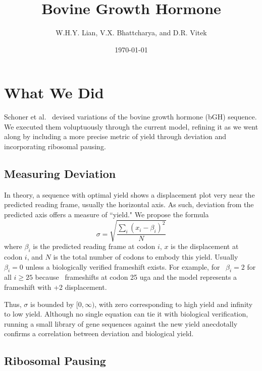 \documentclass[10pt,twocolumn]{article}
\begin{document}
\title{{\bf Bovine Growth Hormone}}
\author{{\sc W.H.Y. Lian, V.X. Bhattcharya, and D.R. Vitek}}
\date{{\sc \today}}
\maketitle

\section{What We Did}
\label{whatwedid}

Schoner et al.~\cite{schoner:bgh} devised variations of the bovine growth hormone (bGH) sequence.
We executed them voluptuously through the current model, refining it as we went along by including
a more precise metric of yield through deviation and incorporating ribosomal pausing.

\subsection{Measuring Deviation}
\label{whatwedid:lbd}

In theory, a sequence with optimal yield shows a displacement plot very near the predicted reading frame,
usually the horizontal axis. As such, deviation from the predicted axis offers a measure of ``yield."
We propose the formula
\begin{equation}
    \label{eqn:lbd}
    \sigma = \sqrt{\frac{\sum_i \left(x_i - \beta_i\right)^2}{N}}
\end{equation}
where $\beta_i$ is the predicted reading frame at codon $i$, $x$ is the displacement at codon $i$,
and $N$ is the total number of codons to embody this yield. Usually $\beta_i = 0$ unless a biologically verified frameshift exists. For example, for \prfB\ $\beta_i = 2$ for all $i \geq 25$ because \prfB\ frameshifts at codon 25 uga
and the model represents a frameshift with +2 displacement.

Thus, $\sigma$ is bounded by $[0,\infty)$, with zero corresponding to high yield and infinity to low yield.
Although no single equation can tie it with biological verification, running a small library of gene sequences
against the new yield anecdotally confirms a correlation between deviation and biological yield.

\subsection{Ribosomal Pausing}
\label{rp}
\end{document}
